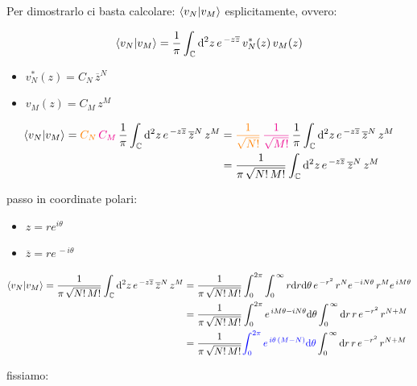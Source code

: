 \begin{myprf}
	Per dimostrarlo ci basta calcolare: $\braket{v_N}{v_M}$ esplicitamente, ovvero:

\begin{align*}
	\braket{v_N}{v_M} = \frac{1}{\pi} \int_{\mathbb{C}} \dd^2 z \, e^{\, -z\overline{z}} \, v^*_N(z)\, v_M(z) 
\end{align*}

\begin{itemize}
	\item $v^*_N(z) = C_N \, \overline{z}^N$
	\item $v_M(z) =  C_M  \, z^M$
\end{itemize}
	
\begin{align*}
	\braket{v_N}{v_M} = \textcolor{orange}{C_N} \, \textcolor{Magenta}{C_M} \, \frac{1}{\pi}\int_{\mathbb{C}} \dd^2 z \, e^{\, -z\overline{z} }\, \overline{z}^N \, z^M & = \textcolor{orange}{\frac{1}{\sqrt{N!}}} \, \textcolor{Magenta}{\frac{1}{\sqrt{M!}}} \, \frac{1}{\pi}\int_{\mathbb{C}} \dd^2 z \, e^{\, -z\overline{z} }\, \overline{z}^N \, z^M \\
	&= \frac{1}{\pi \, \sqrt{N! \, M!}}\int_{\mathbb{C}} \dd^2 z \, e^{\, -z\overline{z} }\, \overline{z}^N \, z^M 
\end{align*}

	passo in coordinate polari:
	
\begin{itemize}
	\item $z = r e^{ i\theta}$
	\item $\overline{z} = r e^{\,- i\theta}$
\end{itemize}

\begin{align*}
	\braket{v_N}{v_M}  = \frac{1}{\pi \, \sqrt{N! \, M!}}\int_{\mathbb{C}} \dd^2 z \, e^{\, -z\overline{z} }\, \overline{z}^N \, z^M & = \frac{1}{\pi \, \sqrt{N! \, M!}}\int_{0}^{2\pi} \int_0^{\, \infty} r \dd r \dd \theta \,e^{\, -r^2}\,  r^{N} e^{\, - iN\theta} \, r^{M}  e^{\,iM\theta} \\
	& = \frac{1}{\pi \, \sqrt{N! \, M!}}\int_{0}^{2\pi}e^{\,iM\theta - iN\theta }  \dd \theta \int_0^{\, \infty} \dd r \, r \, e^{\, -r^2}\,  r^{N+M} \\
	& = \frac{1}{\pi \, \sqrt{N! \, M!}} \textcolor{blue}{\int_{0}^{2\pi}e^{\,i\theta\, \qty(M-N) }  \dd \theta }\int_0^{\, \infty} \dd r \, r \, e^{\, -r^2}\,  r^{N+M} 
\end{align*}

	fissiamo:
	

\end{myprf}
